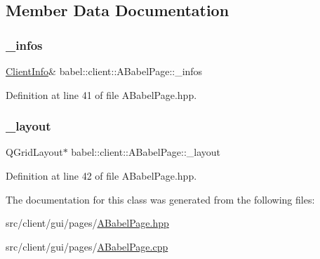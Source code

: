 \subsection{Member Data Documentation}
\mbox{\label{classbabel_1_1client_1_1_a_babel_page_aa2070ebfda878ceff938b8a60e7e2898}} 
\subsubsection{\texorpdfstring{\+\_\+infos}{\_infos}}
{\footnotesize\ttfamily \mbox{\hyperlink{classbabel_1_1client_1_1_client_info}{Client\+Info}}\& babel\+::client\+::\+A\+Babel\+Page\+::\+\_\+infos\hspace{0.3cm}{\ttfamily [protected]}}



Definition at line 41 of file A\+Babel\+Page.\+hpp.

\mbox{\label{classbabel_1_1client_1_1_a_babel_page_a9c304f2168515a54c393a38c89d4e2aa}} 
\subsubsection{\texorpdfstring{\+\_\+layout}{\_layout}}
{\footnotesize\ttfamily Q\+Grid\+Layout$\ast$ babel\+::client\+::\+A\+Babel\+Page\+::\+\_\+layout\hspace{0.3cm}{\ttfamily [protected]}}



Definition at line 42 of file A\+Babel\+Page.\+hpp.



The documentation for this class was generated from the following files\+:\begin{DoxyCompactItemize}
\item 
src/client/gui/pages/\mbox{\hyperlink{_a_babel_page_8hpp}{A\+Babel\+Page.\+hpp}}\item 
src/client/gui/pages/\mbox{\hyperlink{_a_babel_page_8cpp}{A\+Babel\+Page.\+cpp}}\end{DoxyCompactItemize}
